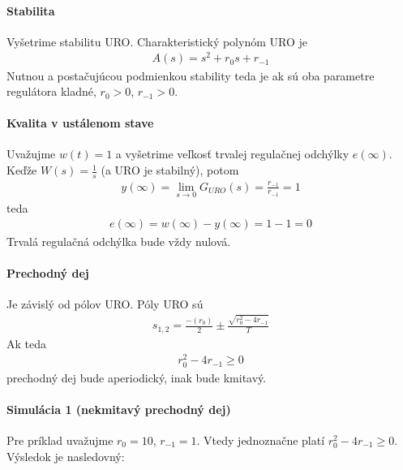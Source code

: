 \documentclass[a4paper, 10pt, ]{article}
\begin{document}
\paragraph{Stabilita}
Vyšetrime stabilitu URO. Charakteristický polynóm URO je
\begin{align}
    A(s) =  s^2 + r_0 s + r_{-1}
\end{align}
Nutnou a postačujúcou podmienkou stability teda je ak sú oba parametre regulátora kladné, $r_0 > 0$, $r_{-1} > 0$.

\paragraph{Kvalita v ustálenom stave}
Uvažujme $w(t) = 1$ a vyšetrime veľkosť trvalej regulačnej odchýlky $e(\infty)$. Keďže $W(s) = \frac{1}{s}$ (a URO je stabilný), potom
\begin{align}
    y(\infty) = \lim_{s\to0} G_{URO}(s) = \frac{r_{-1}}{r_{-1}} = 1
\end{align}
teda
\begin{align}
    e(\infty)
    = w(\infty) - y(\infty)
    = 1 - 1
    = 0
\end{align}
Trvalá regulačná odchýlka bude vždy nulová.

\paragraph{Prechodný dej}
Je závislý od pólov URO. Póly URO sú
\begin{align}
    s_{1,2} = \frac{-(r_0)}{2} \pm \frac{ \sqrt{r_0^2 - 4r_{-1} }}{T}
\end{align}
Ak teda
\begin{align}
     r_0^2 - 4r_{-1} \geq 0
\end{align}
prechodný dej bude aperiodický, inak bude kmitavý.

\paragraph{Simulácia 1 (nekmitavý prechodný dej)}

Pre príklad uvažujme $r_0 = 10$, $r_{-1} = 1$. Vtedy jednoznačne platí $r_0^2 - 4r_{-1} \geq 0$. Výsledok je nasledovný:

\begin{center}




    \figcaption{}

\end{center}
\end{document}
